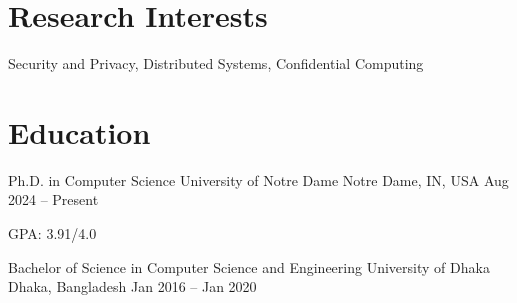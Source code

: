 \documentclass{academic-cv}
\begin{document}
\makecvheader

\section{Research Interests}
Security and Privacy, Distributed Systems, Confidential Computing

\section{Education}
\begin{cventries}
    \cventry
        {Ph.D. in Computer Science}
        {University of Notre Dame}
        {Notre Dame, IN, USA}
        {Aug 2024 -- Present}
        \begin{cvitems}
            \item GPA: 3.91/4.0
        \end{cvitems}

    \cventry
        {Bachelor of Science in Computer Science and Engineering}
        {University of Dhaka}
        {Dhaka, Bangladesh}
        {Jan 2016 -- Jan 2020}
\end{cventries}

\end{document}
